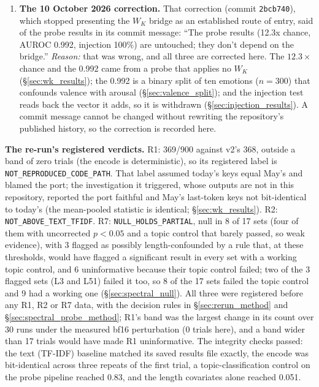 \documentclass[11pt,a4paper]{article}
\begin{document}
\begin{enumerate}[leftmargin=*]
\begin{itemize}[nosep]
    \end{itemize}
    \item \label{app:item:untouched}\textbf{The 10 October 2026 correction.} That correction (commit \texttt{2bcb740}), which stopped presenting the $W_K$ bridge as an established route of entry, said of the probe results in its commit message: ``The probe results (12.3x chance, AUROC 0.992, injection 100\%) are untouched; they don't depend on the bridge.'' \emph{Reason:} that was wrong, and all three are corrected here. The $12.3\times$ chance and the 0.992 came from a probe that applies no $W_K$ (\S\ref{sec:wk_results}); the 0.992 is a binary split of ten emotions ($n = 300$) that confounds valence with arousal (\S\ref{sec:valence_split}); and the injection test reads back the vector it adds, so it is withdrawn (\S\ref{sec:injection_results}). A commit message cannot be changed without rewriting the repository's published history, so the correction is recorded here.
\end{enumerate}

\textbf{The re-run's registered verdicts.} R1: 369/900 against v2's 368, outside a band of zero trials (the encode is deterministic), so its registered label is \texttt{NOT\_REPRODUCED\_CODE\_PATH}. That label assumed today's keys equal May's and blamed the port; the investigation it triggered, whose outputs are not in this repository, reported the port faithful and May's last-token keys not bit-identical to today's (the mean-pooled statistic is identical; \S\ref{sec:wk_results}). R2: \texttt{NOT\_ABOVE\_TEXT\_TFIDF}. R7: \texttt{NULL\_HOLDS\_PARTIAL}, null in 8 of 17 sets (four of them with uncorrected $p < 0.05$ and a topic control that barely passed, so weak evidence), with 3 flagged as possibly length-confounded by a rule that, at these thresholds, would have flagged a significant result in every set with a working topic control, and 6 uninformative because their topic control failed; two of the 3 flagged sets (L3 and L51) failed it too, so 8 of the 17 sets failed the topic control and 9 had a working one (\S\ref{sec:spectral_null}). All three were registered before any R1, R2 or R7 data, with the decision rules in \S\ref{sec:rerun_method} and \S\ref{sec:spectral_probe_method}; R1's band was the largest change in its count over 30 runs under the measured bf16 perturbation (0 trials here), and a band wider than 17 trials would have made R1 uninformative. The integrity checks passed: the text (TF-IDF) baseline matched its saved results file exactly, the encode was bit-identical across three repeats of the first trial, a topic-classification control on the probe pipeline reached 0.83, and the length covariates alone reached 0.051.
\end{document}
